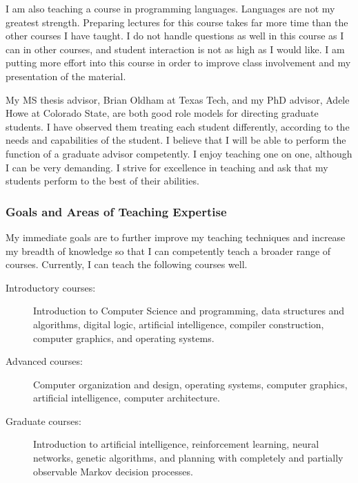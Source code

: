 \documentclass[11pt]{article}
\begin{document}
I am also teaching a course in programming languages.  Languages are
not my greatest strength.  Preparing lectures for this course takes
far more time than the other courses I have taught.  I do not handle
questions as well in this course as I can in other courses, and
student interaction is not as high as I would like.  I am putting
more effort into this course in order to improve class involvement
and my presentation of the material.

My MS thesis advisor, Brian Oldham at Texas Tech, and my PhD
advisor, Adele Howe at Colorado State, are both good role models for
directing graduate students. I have observed them treating each
student differently, according to the needs and capabilities of the
student.  I believe that I will be able to perform the function of a
graduate advisor competently.  I enjoy teaching one on one, although
I can be very demanding.  I strive for excellence in teaching and
ask that my students perform to the best of their abilities.

\subsubsection*{Goals and Areas of Teaching Expertise}

My immediate goals are to further improve my teaching techniques and
increase my breadth of knowledge so that I can competently teach a
broader range of courses.  Currently, I can teach the following
courses well.


\begin{description}
\item[Introductory courses:]  
Introduction to Computer Science and
programming, data structures and algorithms, digital logic, 
artificial intelligence, compiler construction,
computer graphics, and operating systems.

\item[Advanced courses:]  
Computer organization and design, operating systems,
computer graphics, artificial intelligence, computer
architecture.

\item[Graduate courses:]
Introduction to artificial intelligence, reinforcement learning,
neural networks, genetic algorithms, and planning with completely
and partially observable Markov decision processes.

\end{description}
\end{document}
